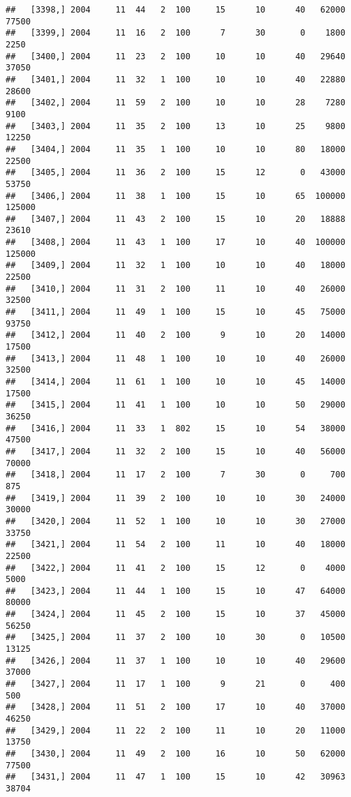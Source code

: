 \documentclass{article}\usepackage[]{graphicx}\usepackage[]{color}
\makeatletter
\newenvironment{kframe}{%
 \def\at@end@of@kframe{}%
 \ifinner\ifhmode%
  \def\at@end@of@kframe{\end{minipage}}%
  \begin{minipage}{\columnwidth}%
 \fi\fi%
 \def\FrameCommand##1{\hskip\@totalleftmargin \hskip-\fboxsep
 \colorbox{shadecolor}{##1}\hskip-\fboxsep
     \hskip-\linewidth \hskip-\@totalleftmargin \hskip\columnwidth}%
 \MakeFramed {\advance\hsize-\width
   \@totalleftmargin\z@ \linewidth\hsize
   \@setminipage}}%
 {\par\unskip\endMakeFramed%
 \at@end@of@kframe}
\newenvironment{knitrout}{}{} %
\makeatother
\begin{document}
\begin{knitrout}
\begin{kframe}
\begin{verbatim}
##   [3398,] 2004     11  44   2  100     15      10      40   62000   77500
##   [3399,] 2004     11  16   2  100      7      30       0    1800    2250
##   [3400,] 2004     11  23   2  100     10      10      40   29640   37050
##   [3401,] 2004     11  32   1  100     10      10      40   22880   28600
##   [3402,] 2004     11  59   2  100     10      10      28    7280    9100
##   [3403,] 2004     11  35   2  100     13      10      25    9800   12250
##   [3404,] 2004     11  35   1  100     10      10      80   18000   22500
##   [3405,] 2004     11  36   2  100     15      12       0   43000   53750
##   [3406,] 2004     11  38   1  100     15      10      65  100000  125000
##   [3407,] 2004     11  43   2  100     15      10      20   18888   23610
##   [3408,] 2004     11  43   1  100     17      10      40  100000  125000
##   [3409,] 2004     11  32   1  100     10      10      40   18000   22500
##   [3410,] 2004     11  31   2  100     11      10      40   26000   32500
##   [3411,] 2004     11  49   1  100     15      10      45   75000   93750
##   [3412,] 2004     11  40   2  100      9      10      20   14000   17500
##   [3413,] 2004     11  48   1  100     10      10      40   26000   32500
##   [3414,] 2004     11  61   1  100     10      10      45   14000   17500
##   [3415,] 2004     11  41   1  100     10      10      50   29000   36250
##   [3416,] 2004     11  33   1  802     15      10      54   38000   47500
##   [3417,] 2004     11  32   2  100     15      10      40   56000   70000
##   [3418,] 2004     11  17   2  100      7      30       0     700     875
##   [3419,] 2004     11  39   2  100     10      10      30   24000   30000
##   [3420,] 2004     11  52   1  100     10      10      30   27000   33750
##   [3421,] 2004     11  54   2  100     11      10      40   18000   22500
##   [3422,] 2004     11  41   2  100     15      12       0    4000    5000
##   [3423,] 2004     11  44   1  100     15      10      47   64000   80000
##   [3424,] 2004     11  45   2  100     15      10      37   45000   56250
##   [3425,] 2004     11  37   2  100     10      30       0   10500   13125
##   [3426,] 2004     11  37   1  100     10      10      40   29600   37000
##   [3427,] 2004     11  17   1  100      9      21       0     400     500
##   [3428,] 2004     11  51   2  100     17      10      40   37000   46250
##   [3429,] 2004     11  22   2  100     11      10      20   11000   13750
##   [3430,] 2004     11  49   2  100     16      10      50   62000   77500
##   [3431,] 2004     11  47   1  100     15      10      42   30963   38704

\end{verbatim}
\end{kframe}
\end{knitrout}
\end{document}
